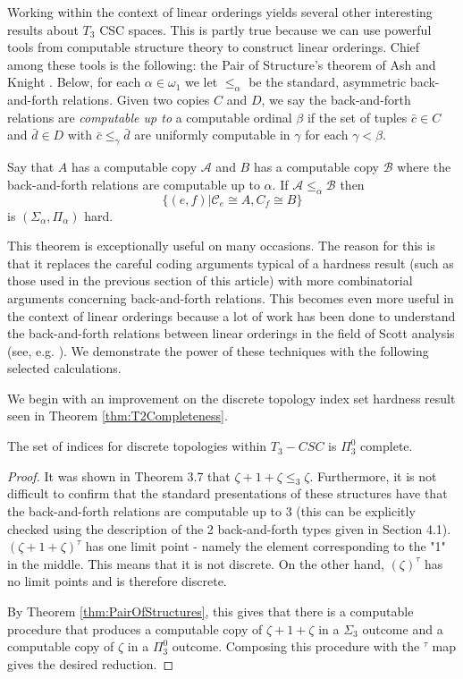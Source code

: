 \documentclass[11pt]{amsart}
\newcommand{\A}{\mathcal{A}}
\newcommand{\B}{\mathcal{B}}
\newcommand{\C}{\mathcal{C}}
\def\A{\mathcal A}
\def\B{\mathcal{B}}
\def\C{\mathcal{C}}
\theoremstyle{remark}
\begin{document}
Working within the context of linear orderings yields several other interesting results about $T_3$ CSC spaces.
This is partly true because we can use powerful tools from computable structure theory to construct linear orderings.
Chief among these tools is the following: the Pair of Structure's theorem of Ash and Knight \cite{AK90}.
Below, for each $\alpha\in\omega_1$ we let $\leq_\alpha$ be the standard, asymmetric back-and-forth relations.
Given two copies $C$ and $D$, we say the back-and-forth relations are \textit{computable up to} a computable ordinal $\beta$ if the set of tuples $\bar{c}\in C$ and $\bar{d}\in D$ with $\bar{c}\leq_\gamma\bar{d}$ are uniformly computable in $\gamma$ for each $\gamma<\beta$.

\begin{theorem}[\cite{AK90}]\label{thm:PairOfStructures}
    Say that $A$ has a computable copy $\A$ and $B$ has a computable copy $\B$ where the back-and-forth relations are computable up to $\alpha$.
    If $\A\leq_\alpha \B$ then
    \[\{(e,f)|\C_e\cong A,C_f\cong B\}\]
    is $(\Sigma_\alpha, \Pi_{\alpha})$ hard.
\end{theorem}

This theorem is exceptionally useful on many occasions.
The reason for this is that it replaces the careful coding arguments typical of a hardness result (such as those used in the previous section of this article) with more combinatorial arguments concerning back-and-forth relations.
This becomes even more useful in the context of linear orderings because a lot of work has been done to understand the back-and-forth relations between linear orderings in the field of Scott analysis (see, e.g. \cite{GR24,GHT25}).
We demonstrate the power of these techniques with the following selected calculations.

We begin with an improvement on the discrete topology index set hardness result seen in Theorem \ref{thm:T2Completeness}.

\begin{proposition}
The set of indices for discrete topologies within $T_3-CSC$ is $\Pi_3^0$ complete.
\end{proposition}

\begin{proof}
It was shown in \cite{GR24} Theorem 3.7 that $\zeta+1+\zeta \leq_3 \zeta$.
Furthermore, it is not difficult to confirm that the standard presentations of these structures have that the back-and-forth relations are computable up to 3 (this can be explicitly checked using the description of the 2 back-and-forth types given in \cite{McountingBF} Section 4.1).
$(\zeta+1+\zeta)^\tau$ has one limit point - namely the element corresponding to the "1" in the middle.
This means that it is not discrete.
On the other hand, $(\zeta)^\tau$ has no limit points and is therefore discrete.

By Theorem \ref{thm:PairOfStructures}, this gives that there is a computable procedure that produces a computable copy of $\zeta+1+\zeta$ in a $\Sigma_3$ outcome and a computable copy of $\zeta$ in a $\Pi_3^0$ outcome.
Composing this procedure with the $^\tau$ map gives the desired reduction.
\end{proof}
\end{document}
